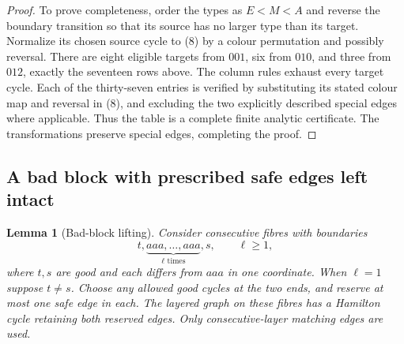 \documentclass[11pt]{article}
\newtheorem{lemma}[theorem]{Lemma}
\theoremstyle{remark}
\numberwithin{equation}{section}
\begin{document}
\begin{proof}
To prove completeness, order the types as $E<M<A$ and reverse the
boundary transition so that its source has no larger type than its
target. Normalize its chosen source cycle to (8) by a colour permutation
and possibly reversal. There are eight eligible targets from $001$,
six from $010$, and three from $012$, exactly the seventeen rows above.
The column rules exhaust every target cycle. Each of the thirty-seven
entries is verified by substituting its stated colour map and reversal
in (8), and excluding the two explicitly described special edges where
applicable. Thus the table is a complete finite analytic certificate.
The transformations preserve special edges, completing the proof.
\end{proof}

\subsection{A bad block with prescribed safe edges left intact}
\begin{lemma}[Bad-block lifting]\label{lem:badblock}
Consider consecutive fibres with boundaries
\[
             t,\underbrace{aaa,\ldots,aaa}_{\ell\text{ times}},s,
             \qquad \ell\ge1,
\]
where $t,s$ are good and each differs from $aaa$ in one coordinate.
When $\ell=1$ suppose $t\ne s$. Choose any allowed good cycles at
the two ends, and reserve at most one safe edge in each. The layered
graph on these fibres has a Hamilton cycle retaining both reserved
edges. Only consecutive-layer matching edges are used.
\end{lemma}
\end{document}
